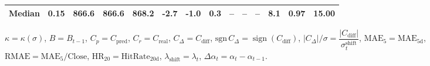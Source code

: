 \begin{threeparttable}
{\begin{tabular}{lrrrrrrrrrrrrr}
 Median &     0.15 & 866.6 & 866.6 & 868.2 &       -2.7 &                     -1.0 &                 0.3 &         -- &        -- &             -- &              8.1 &            0.97 &                  15.00 \\
\bottomrule
\end{tabular}
}
\begin{tablenotes}\footnotesize
\item $\kappa=\kappa(\sigma)$, $B=B_{t-1}$, $C_p=C_{\text{pred}}$, $C_r=C_{\text{real}}$, $C_\Delta=C_{\text{diff}}$, $\mathrm{sgn}\,C_\Delta=\operatorname{sign}(C_{\text{diff}})$, $|C_\Delta|/\sigma=\dfrac{|C_{\text{diff}}|}{\sigma_t^{\text{shift}}}$, $\mathrm{MAE}_5=\mathrm{MAE}_{5\text{d}}$, $\mathrm{RMAE}= \mathrm{MAE}_5 / \text{Close}$, $\mathrm{HR}_{20}=\mathrm{HitRate}_{20\text{d}}$, 
$\lambda_{\text{shift}}=\lambda_t$, 
$\Delta\alpha_t=\alpha_t-\alpha_{t-1}$.
\end{tablenotes}
\end{threeparttable}
\endgroup

